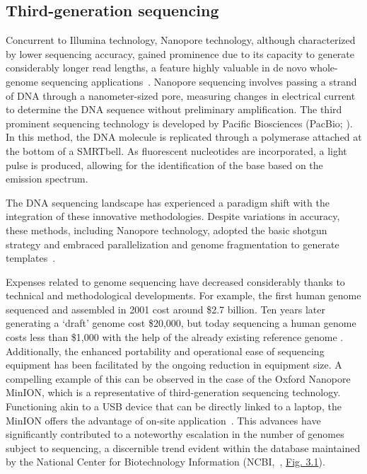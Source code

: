 \subsection{Third-generation sequencing}

Concurrent to Illumina technology, Nanopore technology, although characterized by lower sequencing accuracy, gained prominence due to its capacity to generate considerably longer read lengths, a feature highly valuable in de novo whole-genome sequencing applications~\citep{sevim_shotgun_2019, wang_nanopore_2021}. Nanopore sequencing involves passing a strand of DNA through a nanometer-sized pore, measuring changes in electrical current to determine the \acrshort{DNA} sequence without preliminary amplification. The third prominent sequencing technology is developed by Pacific Biosciences (PacBio; \citet{rhoads_pacbio_2015}). In this method, the DNA molecule is replicated through a polymerase attached at the bottom of a SMRTbell. As fluorescent nucleotides are incorporated, a light pulse is produced, allowing for the identification of the base based on the emission spectrum.

The DNA sequencing landscape has experienced a paradigm shift with the integration of these innovative methodologies. Despite variations in accuracy, these methods, including Nanopore technology, adopted the basic shotgun strategy and embraced parallelization and genome fragmentation to generate templates~\citep{mukhopadhyay_dna_2009}.

Expenses related to genome sequencing have decreased considerably thanks to technical and methodological developments. For example, the first human genome sequenced and assembled in 2001 cost around \$2.7 billion. Ten years later generating a `draft' genome cost \$20,000, but today sequencing a human genome costs less than \$1,000 with the help of the already existing reference genome \citep{neville_cheaper_2018, schwarze_complete_2020, mullin_era_2022}.
Additionally, the enhanced portability and operational ease of sequencing equipment has been facilitated by the ongoing reduction in equipment size. A compelling example of this can be observed in the case of the Oxford Nanopore MinION, which is a representative of third-generation sequencing technology. Functioning akin to a USB device that can be directly linked to a laptop, the MinION offers the advantage of on-site application~\citep{huo_miniaturized_2021}. This advances have significantly contributed to a noteworthy escalation in the number of genomes subject to sequencing, a discernible trend evident within the database maintained by the National Center for Biotechnology Information (NCBI,~\citet{ncbi_resource_coordinators_database_2018}, \hyperref[fig:nbassemblyinsdc]{Fig. 3.1}).

